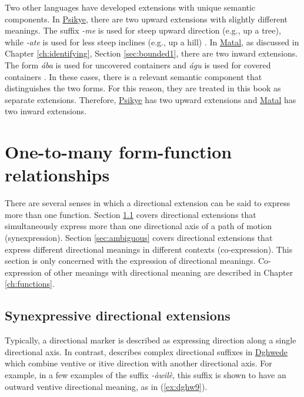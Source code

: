 Two other languages have developed extensions with unique semantic components. In \hyperref[psik]{Psikye}, there are two upward extensions with slightly different meanings. The suffix \textit{-me} is used for steep upward direction (e.g., up a tree), while \textit{-ate} is used for less steep inclines (e.g., up a hill) \citep{smithKapsikiLanguage1969}. In \hyperref[mata]{Matal}, as discussed in Chapter \ref{ch:identifying}, Section \ref{sec:bounded1}, there are two inward extensions. The form \textit{ába} is used for uncovered containers and \textit{águ} is used for covered containers \citep[76]{dougopheGrammarMatal2021}. In these cases, there is a relevant semantic component that distinguishes the two forms. For this reason, they are treated in this book as separate extensions. Therefore, \hyperref[psik]{Psikye} has two upward extensions and \hyperref[mata]{Matal} has two inward extensions. 

\section{One-to-many form-function relationships} \label{sec:onetomany}

There are several senses in which a directional extension can be said to express more than one function. Section \ref{sec:portmanteau} covers directional extensions that simultaneously express more than one directional axis of a path of motion (synexpression). Section \ref{sec:ambiguous} covers directional extensions that express different directional meanings in different contexts (co-expression). This section is only concerned with the expression of directional meanings. Co-expression of other meanings with directional meaning are described in Chapter \ref{ch:functions}. 

\subsection{Synexpressive directional extensions} \label{sec:portmanteau}

Typically, a directional marker is described as expressing direction along a single directional axis. In contrast, \citet{frickVerbalSystemDghwede1978} describes complex directional suffixes in \hyperref[dghw]{Dghwede} which combine ventive or itive direction with another directional axis. For example, in a few examples of the suffix \textit{-àwilè}, this suffix is shown to have an outward ventive directional meaning, as in (\ref{ex:dghw9}). 

